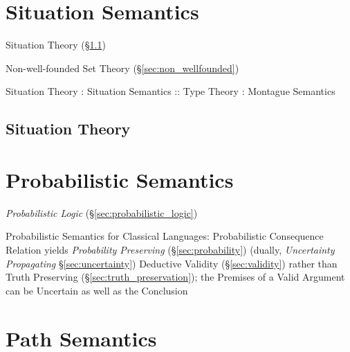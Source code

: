 \section{Situation Semantics}\label{sec:situation_semantics}

Situation Theory (\S\ref{sec:situation_theory})

Non-well-founded Set Theory (\S\ref{sec:non_wellfounded})

Situation Theory : Situation Semantics
  :: Type Theory : Montague Semantics



\subsection{Situation Theory}\label{sec:situation_theory}



\section{Probabilistic Semantics}\label{sec:probabilistic_semantics}

\fist \emph{Probabilistic Logic} (\S\ref{sec:probabilistic_logic})

Probabilistic Semantics for Classical Languages: Probabilistic Consequence
Relation yields \emph{Probability Preserving} (\S\ref{sec:probability}) (dually,
\emph{Uncertainty Propagating} \S\ref{sec:uncertainty}) Deductive Validity
(\S\ref{sec:validity}) rather than Truth Preserving
(\S\ref{sec:truth_preservation}); the Premises of a Valid Argument can be
Uncertain as well as the Conclusion



\section{Path Semantics}\label{sec:path_semantics}

